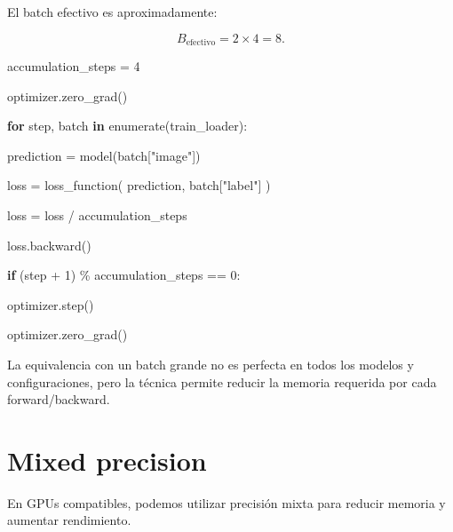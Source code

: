 \documentclass[
  letterpaper,
  DIV=11,
  numbers=noendperiod]{scrartcl}
\newenvironment{Shaded}{\begin{snugshade}}{\end{snugshade}}
\newcommand{\BuiltInTok}[1]{\textcolor[rgb]{0.00,0.23,0.31}{#1}}
\newcommand{\ControlFlowTok}[1]{\textcolor[rgb]{0.00,0.23,0.31}{\textbf{#1}}}
\newcommand{\DecValTok}[1]{\textcolor[rgb]{0.68,0.00,0.00}{#1}}
\newcommand{\KeywordTok}[1]{\textcolor[rgb]{0.00,0.23,0.31}{\textbf{#1}}}
\newcommand{\NormalTok}[1]{\textcolor[rgb]{0.00,0.23,0.31}{#1}}
\newcommand{\OperatorTok}[1]{\textcolor[rgb]{0.37,0.37,0.37}{#1}}
\newcommand{\StringTok}[1]{\textcolor[rgb]{0.13,0.47,0.30}{#1}}
\begin{document}
El batch efectivo es aproximadamente:

\[
B_{\mathrm{efectivo}}
=
2\times4=8.
\]

\begin{Shaded}
\begin{Highlighting}[]
\NormalTok{accumulation\_steps }\OperatorTok{=} \DecValTok{4}

\NormalTok{optimizer.zero\_grad()}

\ControlFlowTok{for}\NormalTok{ step, batch }\KeywordTok{in} \BuiltInTok{enumerate}\NormalTok{(train\_loader):}

\NormalTok{    prediction }\OperatorTok{=}\NormalTok{ model(batch[}\StringTok{"image"}\NormalTok{])}

\NormalTok{    loss }\OperatorTok{=}\NormalTok{ loss\_function(}
\NormalTok{        prediction,}
\NormalTok{        batch[}\StringTok{"label"}\NormalTok{]}
\NormalTok{    )}

\NormalTok{    loss }\OperatorTok{=}\NormalTok{ loss }\OperatorTok{/}\NormalTok{ accumulation\_steps}

\NormalTok{    loss.backward()}

    \ControlFlowTok{if}\NormalTok{ (step }\OperatorTok{+} \DecValTok{1}\NormalTok{) }\OperatorTok{\%}\NormalTok{ accumulation\_steps }\OperatorTok{==} \DecValTok{0}\NormalTok{:}

\NormalTok{        optimizer.step()}

\NormalTok{        optimizer.zero\_grad()}
\end{Highlighting}
\end{Shaded}

La equivalencia con un batch grande no es perfecta en todos los modelos
y configuraciones, pero la técnica permite reducir la memoria requerida
por cada forward/backward.

\section{Mixed precision}\label{mixed-precision}

En GPUs compatibles, podemos utilizar precisión mixta para reducir
memoria y aumentar rendimiento.
\end{document}
